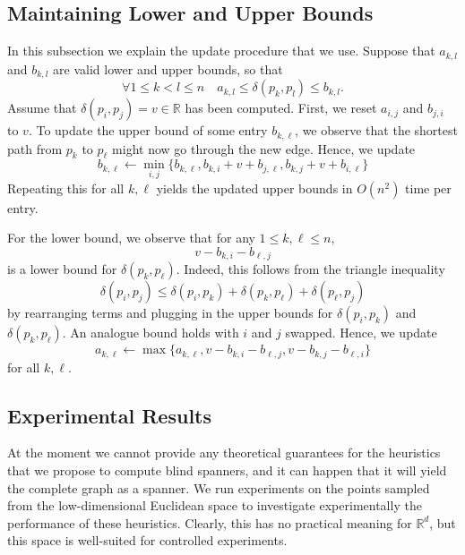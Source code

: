 \documentclass[a4paper,USenglish]{socg-lipics-v2018}
\newcommand{\R}{\mathbb{R}}
\newcommand{\dist}{\delta}
\begin{document}
 \subsection{Maintaining Lower and Upper Bounds}

 In this subsection we explain the update procedure that we use. Suppose that
 $a_{k,l}$ and $b_{k,l}$ are valid lower and upper bounds, so that
\[
     \forall 1 \leq k < l \leq n \quad a_{k,l} \leq \dist(p_k, p_l) \leq b_{k,l}.
\]
Assume that $\dist(p_i,p_j)=v\in\R$ has been computed.
First, we reset $a_{i,j}$ and $b_{j,i}$ to $v$. 
To update the upper bound of some entry $b_{k,\ell}$,
we observe that the shortest path from $p_k$ to $p_\ell$ might now
go through the new edge. Hence, we update
\[
    b_{k,\ell}\gets \min_{i,j}\{b_{k,\ell},b_{k,i}+v+b_{j,\ell},b_{k,j}+v+b_{i,\ell}\}
\]
Repeating this for all $k,\ell$ yields the updated upper bounds in $O(n^2)$
time per entry.

For the lower bound, we observe that for any $1\leq k,\ell\leq n$,
\[
    v-b_{k,i}-b_{\ell,j}
\]
is a lower bound for $\dist(p_k,p_\ell)$. Indeed, this follows from
the triangle inequality
%
\[\dist(p_i,p_j)\leq \dist(p_i,p_k)+\dist(p_k,p_\ell)+\dist(p_\ell,p_j)\]
by rearranging terms and plugging in the upper bounds for $\dist(p_i,p_k)$
and $\dist(p_k,p_\ell)$. An analogue bound holds with $i$ and $j$ swapped. Hence, we update
%
\[a_{k,\ell}\gets \max\{a_{k,\ell},v-b_{k,i}-b_{\ell,j},v-b_{k,j}-b_{\ell,i}\}\]
%
for all $k,\ell$.



\subsection{Experimental Results}
At the moment we cannot provide any theoretical guarantees for the heuristics that we propose to compute blind spanners,
and it can happen that it will yield the complete graph as a spanner.
We run experiments on the points sampled from the low-dimensional Euclidean space to investigate
experimentally the performance of these heuristics. Clearly, this has no practical meaning for $\R^d$, but
this space is well-suited for controlled experiments.
\end{document}
